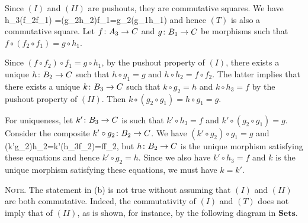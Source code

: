 \bs
\ben[label=(\alph*)]
\item Since $(I)$ and $(II)$ are pushouts, they are commutative squares. We have
\bse
h_3\circ (f_2\circ f_1) =(g_2\circ h_2)\circ f_1=g_2\circ (g_1\circ h_1)
\ese
and hence $(T)$ is also a commutative square. Let $f\colon A_3\to C$ and $g\colon B_1\to C$ be morphisms such that $f\circ(f_2\circ f_1)=g\circ h_1$.
\bse
{}
\ese
Since $(f\circ f_2)\circ f_1=g\circ h_1$, by the pushout property of $(I)$, there exists a unique $h\colon B_2\to C$ such that $h\circ g_1=g$ and $h\circ h_2=f\circ f_2$. The latter implies that there exists a unique $k\colon B_3\to C$ such that $k\circ g_2 = h$ and $k\circ h_3=f$ by the pushout property of $(II)$. Then $k\circ(g_2\circ g_1)=h\circ g_1=g$.

For uniqueness, let $k'\colon B_3\to C$ is such that $k'\circ h_3=f$ and $k'\circ (g_2\circ g_1)=g$. Consider the composite $k'\circ g_2\colon B_2\to C$. We have $(k'\circ g_2)\circ g_1=g$ and 
\bse
(k'\circ g_2)\circ h_2=k'\circ (h_3\circ f_2)=f\circ f_2,
\ese
but $h\colon B_2\to C$ is the unique morphism satisfying these equations and hence $k'\circ g_2 =h$. Since we also have $k'\circ h_3=f$ and $k$ is the unique morphism satisfying these equations, we must have $k=k'$. 
\item {\scshape Note}. The statement in (b) is not true without assuming that $(I)$ and $(II)$ are both commutative. Indeed, the commutativity of $(I)$ and $(T)$ does not imply that of $(II)$, as is shown, for instance, by the following diagram in $\mathbf{Sets}$. 
\bse
{}
\ese

